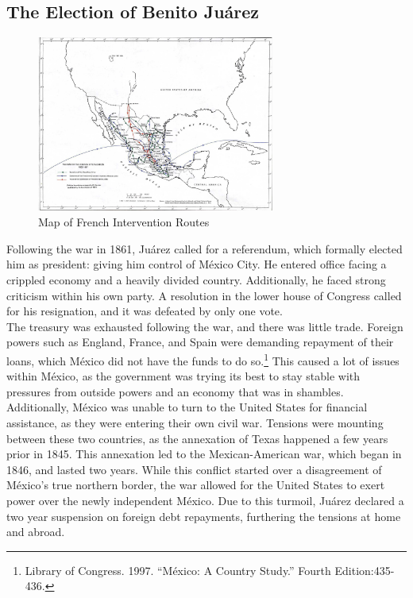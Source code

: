 \documentclass[10pt, letterpaper]{article}
\begin{document}
\subsection{The Election of Benito Juárez}
\begin{figure}
\centering
\includegraphics[width=3.06771in,height=2.2762in]{image5.png}
\caption{Map of French Intervention Routes}
\end{figure}
Following the war in 1861, Juárez called for a referendum, which
formally elected him as president: giving him control of México City. He
entered office facing a crippled economy and a heavily divided country.
Additionally, he faced strong criticism within his own party. A
resolution in the lower house of Congress called for his resignation,
and it was defeated by only one vote. \\

The treasury was exhausted following the war, and there was little
trade. Foreign powers such as England, France, and Spain were demanding
repayment of their loans, which México did not have the funds to do
so.\footnote{Library of Congress. 1997. ``México: A Country Study.''
  Fourth Edition:435-436.} This caused a lot of issues within México, as
the government was trying its best to stay stable with pressures from
outside powers and an economy that was in shambles. Additionally, México
was unable to turn to the United States for financial assistance, as
they were entering their own civil war. Tensions were mounting between
these two countries, as the annexation of Texas happened a few years
prior in 1845. This annexation led to the Mexican-American war, which
began in 1846, and lasted two years. While this conflict started over a
disagreement of México's true northern border, the war allowed for the
United States to exert power over the newly independent México. Due to
this turmoil, Juárez declared a two year suspension on foreign debt
repayments, furthering the tensions at home and abroad. \\
\end{document}
